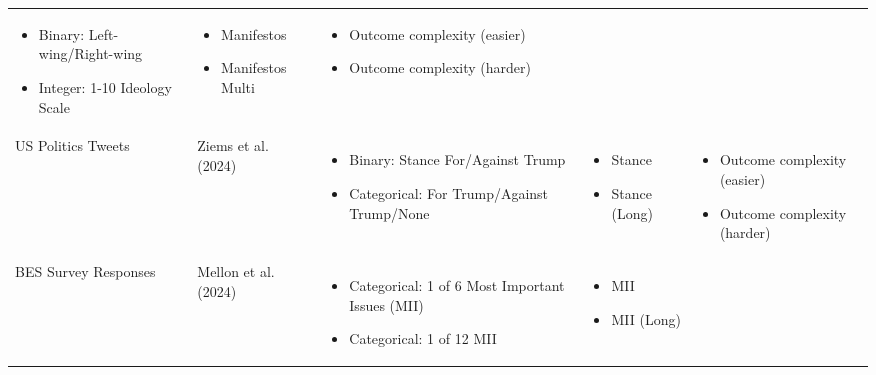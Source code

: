 \documentclass{article}
\begin{document}
\begin{landscape}
\begin{table}[htbp]
\begin{tabular}{p{2cm}p{2cm}p{6cm}p{4cm}p{4cm}}
\begin{itemize}[nosep,leftmargin=*]
            \item Binary: Left-wing/Right-wing
            \item Integer: 1-10 Ideology Scale
        \end{itemize} & \begin{itemize}[nosep,leftmargin=*]
            \item Manifestos
            \item Manifestos Multi
        \end{itemize} & \begin{itemize}[nosep,leftmargin=*]
            \item Outcome complexity (easier)
            \item Outcome complexity (harder)
        \end{itemize} \\
        \addlinespace[0.5em]
        US Politics Tweets & Ziems et al. (2024) & \begin{itemize}[nosep,leftmargin=*]
            \item Binary: Stance For/Against Trump
            \item Categorical: For Trump/Against Trump/None
        \end{itemize} & \begin{itemize}[nosep,leftmargin=*]
            \item Stance
            \item Stance (Long)
        \end{itemize} & \begin{itemize}[nosep,leftmargin=*]
            \item Outcome complexity (easier)
            \item Outcome complexity (harder)
        \end{itemize} \\
        \addlinespace[0.5em]
        BES Survey Responses & Mellon et al. (2024) & \begin{itemize}[nosep,leftmargin=*]
            \item Categorical: 1 of 6 Most Important Issues (MII)
            \item Categorical: 1 of 12 MII
        \end{itemize} & \begin{itemize}[nosep,leftmargin=*]
            \item MII
            \item MII (Long)
        \end{itemize} & \begin{itemize}[nosep,leftmargin=*]

\end{itemize}
\end{tabular}
\end{table}
\end{landscape}
\end{document}

